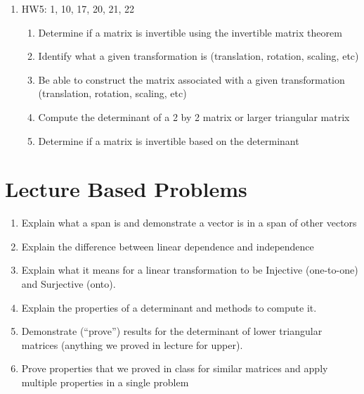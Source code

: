 \documentclass[12pt]{exam}
\begin{document}
\begin{enumerate}
\begin{enumerate}
        \item Be able to construct the matrix associated with a given transformation
            (translation, rotation, scaling, etc)
        \item Determine if a given transformation is injective/surjective
        \item Determine when matrix-multiplication is defined and compute the matrix product
        \item Compute the transpose of a matrix
        \item Determine how many solutions invertible and non-invertible matrices can have.
    \end{enumerate}
    \item HW5: 1, 10, 17, 20, 21, 22
    \begin{enumerate}
        \item Determine if a matrix is invertible using the invertible matrix theorem
        \item Identify what a given transformation is (translation, rotation, scaling, etc)
        \item Be able to construct the matrix associated with a given transformation
            (translation, rotation, scaling, etc)
        \item Compute the determinant of a 2 by 2 matrix or larger triangular matrix
        \item Determine if a matrix is invertible based on the determinant
    \end{enumerate}
\end{enumerate}
\section{Lecture Based Problems}
\begin{enumerate}
    \item Explain what a span is and demonstrate a vector is in a span of other vectors
    \item Explain the difference between linear dependence and independence
    \item Explain what it means for a linear transformation to be Injective (one-to-one) and
        Surjective (onto).
    \item Explain the properties of a determinant and methods to compute it.
    \item Demonstrate (``prove'') results for the determinant of lower triangular matrices (anything we proved in lecture for upper).
    \item Prove properties that we proved in class for similar matrices and apply multiple properties in a single problem
\end{enumerate}
\end{document}

